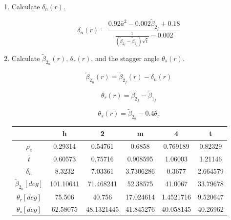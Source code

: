 \documentclass[titlepage]{article}
\begin{document}
\begin{enumerate}
    \item Calculate $\delta_{n}(r)$.
    
    \begin{equation}
        \delta_{n}(r) = \frac{0.92\bar{a}^{2} -0.002 \tilde{\beta}_{2_{f}} + 0.18}{ \frac{1}{(\tilde{\beta}_{2_{f}} -\tilde{\beta}_{1_{f}}) \sqrt{\bar{t}}} - 0.002}                                                             
    \end{equation}

    \item Calculate $\tilde{\beta}_{2_{n}}(r)$, $\theta_{r}(r)$, and the stagger angle $\theta_{s}(r)$.
    
    \begin{equation}
        \tilde{\beta}_{2_{n}}(r) = \tilde{\beta}_{2_{f}}(r) - \delta_{n}(r) 
    \end{equation}

    \begin{equation}
        \theta_{r}(r) = \tilde{\beta}_{2_{f}} - \tilde{\beta}_{1_{f}}
    \end{equation}

    \begin{equation}
        \theta_{s}(r) = \tilde{\beta}_{2_{n}} - 0.4 \theta_{r}
    \end{equation}

    \begin{center}
        \begin{tabular}{|c|c|c|c|c|c|}
            \hline
            & h & 2 & m & 4 & t \\
            \hline
            $\rho_{c}$ & 0.29314 & 0.54761 & 0.6858 & 0.769189 & 0.82329 \\
            \hline
            $\bar{t}$ & 0.60573 & 0.75716 & 0.908595 & 1.06003 & 1.21146\\
            \hline
            $\delta_{n}$ & 8.3232 & 7.03361 & 3.7306286 & 0.3677 & 2.664579 \\
            \hline
            $\tilde{\beta}_{2_{n}} [deg]$ & 101.10641 & 71.468241 & 52.38575 & 41.0067 & 33.79678 \\
            \hline
            $\theta_{r} [deg]$ & 75.506 & 40.756 & 17.024614 & 1.4521716 & 9.520647 \\
            \hline
            $\theta_{s} [deg]$ & 62.58075 & 48.1321445 & 41.845276 & 40.058145 & 40.26962 \\
            \hline
        \end{tabular}
    \end{center}



\end{enumerate}
\end{document}
